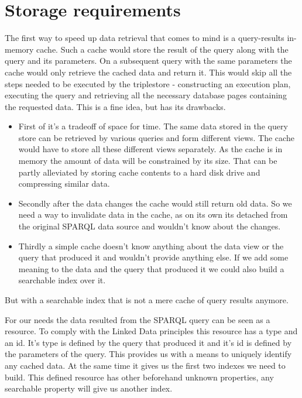 \section{Storage requirements}
\label{sec:StorageRequirements}
The first way to speed up data retrieval that comes to mind is a query-results in-memory cache. Such a cache would store the result of the query along with the query and its parameters. On a subsequent query with the same parameters the cache would only retrieve the cached data and return it. This would skip all the steps needed to be executed by the triplestore - constructing an execution plan, executing the query and retrieving all the necessary database pages containing the requested data. This is a fine idea, but has its drawbacks.
\begin{itemize}
	\item First of it's a tradeoff of space for time. The same data stored in the query store can be retrieved by various queries and form different views. The cache would have to store all these different views separately. As the cache is in memory the amount of data will be constrained by its size. That can be partly alleviated by storing cache contents to a hard disk drive and compressing similar data.
	\item Secondly after the data changes the cache would still return old data. So we need a way to invalidate data in the cache, as on its own its detached from the original SPARQL data source and wouldn't know about the changes.
	\item Thirdly a simple cache doesn't know anything about the data view or the query that produced it and wouldn't provide anything else. If we add some meaning to the data and the query that produced it we could also build a searchable index over it.
\end{itemize}
But with a searchable index that is not a mere cache of query results anymore.

For our needs the data resulted from the SPARQL query can be seen as a resource. To comply with the Linked Data principles this resource has a type and an id. It's type is defined by the query that produced it and it's id is defined by the parameters of the query. This provides us with a means to uniquely identify any cached data. At the same time it gives us the first two indexes we need to build. This defined resource has other beforehand unknown properties, any searchable property will give us another index.

